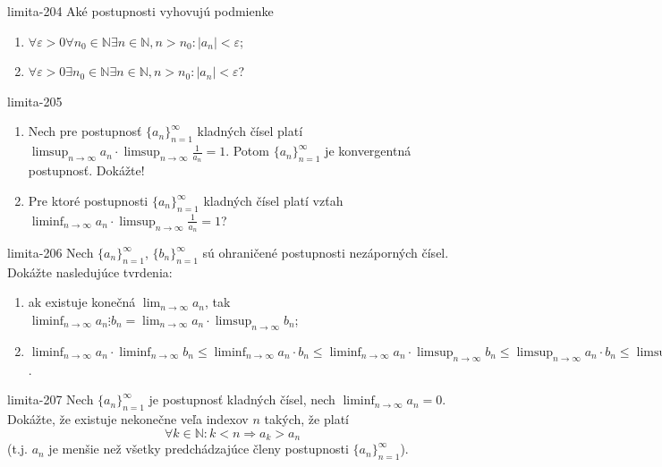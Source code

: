 \begin{defproblem}{limita-204}
Aké postupnosti vyhovujú podmienke
\begin{enumerate}
\item $\forall \varepsilon >0 \forall n_0 \in \mathbb{N} \exists n \in \mathbb{N},n>n_0: |a_n|< \varepsilon$;
\item $\forall \varepsilon >0 \exists n_0 \in \mathbb{N} \exists n \in \mathbb{N},n>n_0: |a_n|< \varepsilon$?
\end{enumerate}
\end{defproblem}

\begin{defproblem}{limita-205}
\begin{enumerate}
\item Nech pre postupnosť ${\{a_n\}}_{n=1}^\infty$ kladných čísel platí $\limsup_{n \rightarrow \infty} a_n \cdot \limsup_{n \rightarrow \infty} \frac{1}{a_n}=1$. Potom ${\{a_n\}}_{n=1}^\infty$ je konvergentná postupnosť. Dokážte!
\item Pre ktoré postupnosti ${\{a_n\}}_{n=1}^\infty$ kladných čísel platí vzťah $\liminf_{n \rightarrow \infty} a_n \cdot \limsup_{n \rightarrow \infty} \frac{1}{a_n}=1$?
\end{enumerate}
\end{defproblem}

\begin{defproblem}{limita-206}
Nech ${\{a_n\}}_{n=1}^\infty$, ${\{b_n\}}_{n=1}^\infty$ sú ohraničené postupnosti nezáporných čísel. Dokážte nasledujúce tvrdenia:
\begin{enumerate}
\item ak existuje konečná $\lim_{n \rightarrow \infty} a_n$, tak $\liminf_{n \rightarrow \infty} a_n \vdots b_n=\lim_{n \rightarrow \infty} a_n \cdot \limsup_{n \rightarrow \infty} b_n$;
\item $\liminf_{n \rightarrow \infty} a_n \cdot \liminf_{n \rightarrow \infty} b_n \leq \liminf_{n \rightarrow \infty} a_n \cdot b_n \leq \liminf_{n \rightarrow \infty} a_n \cdot \limsup_{n \rightarrow \infty} b_n \leq \limsup_{n \rightarrow \infty} a_n \cdot b_n \leq \limsup_{n \rightarrow \infty} a_n \cdot \limsup_{n \rightarrow \infty} b_n$.
\end{enumerate}
\end{defproblem}

\begin{defproblem}{limita-207}
Nech ${\{a_n\}}_{n=1}^\infty$ je postupnosť kladných čísel, nech $\liminf_{n \rightarrow \infty} a_n =0$. Dokážte, že existuje nekonečne veľa indexov $n$ takých, že platí $$\forall k \in \mathbb{N}: k<n \Rightarrow a_k>a_n$$
(t.j. $a_n$ je menšie než všetky predchádzajúce členy postupnosti ${\{a_n\}}_{n=1}^\infty$).
\end{defproblem}